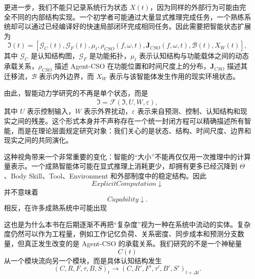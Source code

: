 更进一步，我们不能只记录系统行为状态 $X(t)$，因为同样的外部行为可能由完全不同的内部结构实现。一个初学者可能通过大量显式推理完成任务，一个熟练系统却可以通过已经编译好的快速局部闭环完成相同任务。因此需要把智能状态扩展为
\begin{equation}
\mathfrak{I}(t)
=
\left[
\mathcal{G}_{C}(t),
\mathcal{G}_{F}(t),
\mu_t,
\rho_{CSO}(f,\omega,t),
\mathbf{J}_{CSO}(f,\omega,t),
\mathcal{B}(t),
X_{W}(t)
\right],
\end{equation}
其中 $\mathcal{G}_{C}$ 是认知结构图，$\mathcal{G}_{F}$ 是功能拓扑，$\mu_t$ 表示认知结构与功能载体之间的动态承载关系，$\rho_{CSO}$ 描述 Agent-CSO 在功能位置和时间尺度上的分布，$\mathbf{J}_{CSO}$ 描述其迁移流，$\mathcal{B}$ 表示内外边界，而 $X_W$ 表示与该智能体发生作用的现实环境状态。

由此，智能动力学研究的不再是单个状态，而是
\begin{equation}
\boxed{
\dot{\mathfrak{I}}
=
\mathcal{F}
\left(
\mathfrak{I},
U,
W,
\varepsilon
\right),
}
\end{equation}
其中 $U$ 表示控制输入，$W$ 表示外界扰动，$\varepsilon$ 表示来自预测、控制、认知结构和现实之间的残差。这个形式本身并不声称存在一个统一封闭方程可以精确描述所有智能，而是在理论层面规定研究对象：我们关心的是状态、结构、时间尺度、边界和现实之间的共同演化。

这种视角带来一个非常重要的变化：智能的“大小”不能再仅仅用一次推理中的计算量表示。一个成熟智能体可能在显式推理上消耗更少，却拥有更多已经沉降到 $\Theta$、Body Skill、Tool、Environment 和外部制度中的稳定结构。因此
\begin{equation}
ExplicitComputation\downarrow
\end{equation}
并不意味着
\begin{equation}
Capability\downarrow.
\end{equation}
相反，在许多成熟系统中可能出现
\begin{statementbox}
\centering
{}
\end{statementbox}

这也是为什么本书在后期逐渐不再把“复杂度”视为一种在系统中流动的实体。复杂度仍然可以作为工程量，例如工作记忆负荷、关系密度、同步成本和预测分支数量，但真正发生改变的是 Agent-CSO 的承载关系。我们研究的不是一个神秘量
\begin{equation}
C(t)
\end{equation}
从一个模块流向另一个模块，而是具体认知结构发生
\begin{equation}
(C,R,F,\tau,B,S)_t
\rightarrow
(C,R',F',\tau',B',S')_{t+\Delta t}.
\end{equation}

